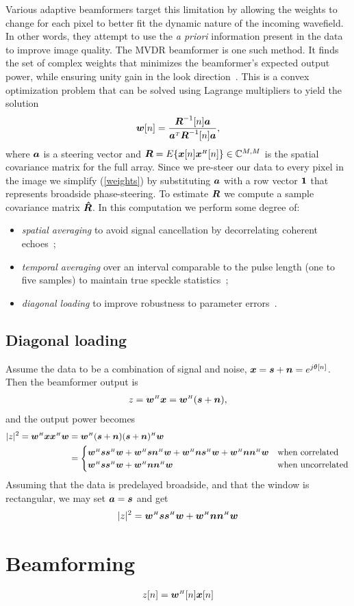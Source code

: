 Various adaptive beamformers target this limitation by allowing the weights to change for each pixel to better fit the dynamic nature of the incoming wavefield. In other words, they attempt to use the \emph{a priori} information present in the data to improve image quality. The MVDR beamformer is one such method. It finds the set of complex weights that minimizes the beamformer's expected output power, while ensuring unity gain in the look direction~\cite{Capon1969}. This is a convex optimization problem that can be solved using Lagrange multipliers to yield the solution
%
\begin{gather}
\vec w[n] = \frac{\Ri[n]\a}{\a\T\Ri[n]\a},\label{weights}
\end{gather}
%
where $\a$ is a steering vector and $\R=E\{\x[n]\x\H[n]\}\in\mathbb{C}^{M,M}$ is the spatial covariance matrix for the full array. Since we pre-steer our data to every pixel in the image we simplify (\ref{weights}) by substituting $\a$ with a row vector $\1$ that represents broadside phase-steering. To estimate $\R$ we compute a sample covariance matrix $\eR$. In this computation we perform some degree of:
%
\begin{itemize}
\item \emph{spatial averaging} to avoid signal cancellation by decorrelating coherent echoes~\cite{Kailath1985};
\item \emph{temporal averaging} over an interval comparable to the pulse length (one to five samples) to maintain true speckle statistics~\cite{Synnevag2009a};
\item \emph{diagonal loading} to improve robustness to parameter errors~\cite{Cox1987,Maksym1979}.
\end{itemize}%

\subsection{Diagonal loading}

Assume the data to be a combination of signal and noise, $\x = \s + \n = e^{j\theta[n]}$. Then the beamformer output is
%
\begin{align}
z = \w\H\x = \w\H(\s+\n),
\end{align}
%
and the output power becomes
%
\begin{align}
|z|^2 = \w\H\x\x\H\w &= \w\H(\s+\n)(\s+\n)\H\w \nn
&= \begin{cases}
\w\H\s\s\H\w + \w\H\s\n\H\w + \w\H\n\s\H\w + \w\H\n\n\H\w &\text{when correlated}\\
\w\H\s\s\H\w + \w\H\n\n\H\w &\text{when uncorrelated}
\end{cases}
\end{align}
%
Assuming that the data is predelayed broadside, and that the window is rectangular, we may set $\a = \s$ and get
%
\begin{align}
|z|^2 = \w\H\s\s\H\w + \w\H\n\n\H\w
\end{align}


\newpage
\section{Beamforming}



\begin{align}
z[n] = \w\H[n]\x[n]
\end{align}


